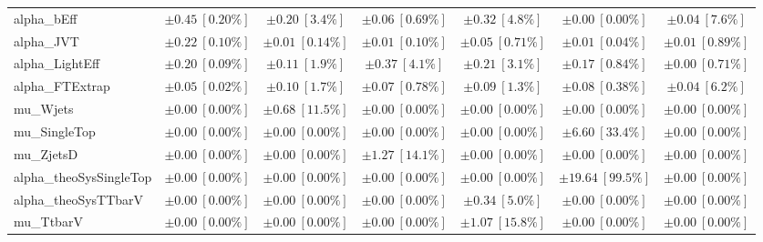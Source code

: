 \begin{sidewaystable}
\begin{center}
\begin{tabular*}{\textwidth}{@{\extracolsep{\fill}}lcccccc}
alpha\_bEff         & $\pm 0.45\ [0.20\%] $          & $\pm 0.20\ [3.4\%] $          & $\pm 0.06\ [0.69\%] $          & $\pm 0.32\ [4.8\%] $          & $\pm 0.00\ [0.00\%] $          & $\pm 0.04\ [7.6\%] $       \\
alpha\_JVT         & $\pm 0.22\ [0.10\%] $          & $\pm 0.01\ [0.14\%] $          & $\pm 0.01\ [0.10\%] $          & $\pm 0.05\ [0.71\%] $          & $\pm 0.01\ [0.04\%] $          & $\pm 0.01\ [0.89\%] $       \\
alpha\_LightEff         & $\pm 0.20\ [0.09\%] $          & $\pm 0.11\ [1.9\%] $          & $\pm 0.37\ [4.1\%] $          & $\pm 0.21\ [3.1\%] $          & $\pm 0.17\ [0.84\%] $          & $\pm 0.00\ [0.71\%] $       \\
alpha\_FTExtrap         & $\pm 0.05\ [0.02\%] $          & $\pm 0.10\ [1.7\%] $          & $\pm 0.07\ [0.78\%] $          & $\pm 0.09\ [1.3\%] $          & $\pm 0.08\ [0.38\%] $          & $\pm 0.04\ [6.2\%] $       \\
mu\_Wjets         & $\pm 0.00\ [0.00\%] $          & $\pm 0.68\ [11.5\%] $          & $\pm 0.00\ [0.00\%] $          & $\pm 0.00\ [0.00\%] $          & $\pm 0.00\ [0.00\%] $          & $\pm 0.00\ [0.00\%] $       \\
mu\_SingleTop         & $\pm 0.00\ [0.00\%] $          & $\pm 0.00\ [0.00\%] $          & $\pm 0.00\ [0.00\%] $          & $\pm 0.00\ [0.00\%] $          & $\pm 6.60\ [33.4\%] $          & $\pm 0.00\ [0.00\%] $       \\
mu\_ZjetsD         & $\pm 0.00\ [0.00\%] $          & $\pm 0.00\ [0.00\%] $          & $\pm 1.27\ [14.1\%] $          & $\pm 0.00\ [0.00\%] $          & $\pm 0.00\ [0.00\%] $          & $\pm 0.00\ [0.00\%] $       \\
alpha\_theoSysSingleTop         & $\pm 0.00\ [0.00\%] $          & $\pm 0.00\ [0.00\%] $          & $\pm 0.00\ [0.00\%] $          & $\pm 0.00\ [0.00\%] $          & $\pm 19.64\ [99.5\%] $          & $\pm 0.00\ [0.00\%] $       \\
alpha\_theoSysTTbarV         & $\pm 0.00\ [0.00\%] $          & $\pm 0.00\ [0.00\%] $          & $\pm 0.00\ [0.00\%] $          & $\pm 0.34\ [5.0\%] $          & $\pm 0.00\ [0.00\%] $          & $\pm 0.00\ [0.00\%] $       \\
mu\_TtbarV         & $\pm 0.00\ [0.00\%] $          & $\pm 0.00\ [0.00\%] $          & $\pm 0.00\ [0.00\%] $          & $\pm 1.07\ [15.8\%] $          & $\pm 0.00\ [0.00\%] $          & $\pm 0.00\ [0.00\%] $       \\

\end{tabular*}
\end{center}
\end{sidewaystable}
